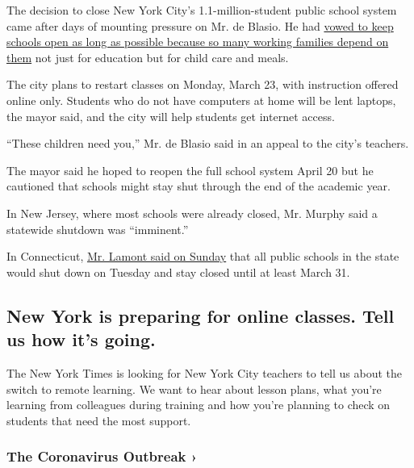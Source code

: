 The decision to close New York City's 1.1-million-student public school
system came after days of mounting pressure on Mr. de Blasio. He had
\href{https://www.nytimes3xbfgragh.onion/2020/03/16/nyregion/nyc-schools-closed-coronavirus.html}{vowed
to keep schools open as long as possible because so many working
families depend on them} not just for education but for child care and
meals.

The city plans to restart classes on Monday, March 23, with instruction
offered online only. Students who do not have computers at home will be
lent laptops, the mayor said, and the city will help students get
internet access.

``These children need you,'' Mr. de Blasio said in an appeal to the
city's teachers.

The mayor said he hoped to reopen the full school system April 20 but he
cautioned that schools might stay shut through the end of the academic
year.

In New Jersey, where most schools were already closed, Mr. Murphy said a
statewide shutdown was ``imminent.''

In Connecticut,
\href{https://twitter.com/govnedlamont/status/1239315132435619843?s=21}{Mr.
Lamont said on Sunday} that all public schools in the state would shut
down on Tuesday and stay closed until at least March 31.

\hypertarget{new-york-is-preparing-for-online-classes-tell-us-how-its-going}{%
\subsection{New York is preparing for online classes. Tell us how it's
going.}\label{new-york-is-preparing-for-online-classes-tell-us-how-its-going}}

The New York Times is looking for New York City teachers to tell us
about the switch to remote learning. We want to hear about lesson plans,
what you're learning from colleagues during training and how you're
planning to check on students that need the most support.

\href{https://www.nytimes3xbfgragh.onion/news-event/coronavirus?action=click\&pgtype=Article\&state=default\&region=MAIN_CONTENT_3\&context=storylines_faq}{}

\hypertarget{the-coronavirus-outbreak-}{%
\subsubsection{The Coronavirus Outbreak
›}\label{the-coronavirus-outbreak-}}


